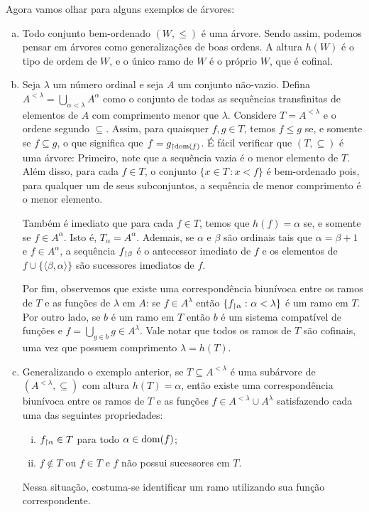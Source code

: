 \documentclass[a4paper]{article}
\begin{document}
  Agora vamos olhar para alguns exemplos de árvores:
  \begin{exemplo}\hfill
    \begin{enumerate}[(a)]
    \item Todo conjunto bem-ordenado \((W,\leq)\) é uma árvore. Sendo assim,
      podemos pensar em árvores como generalizações de boas ordens. A altura
      \(h(W)\) é o tipo de ordem de \(W\), e o único ramo de \(W\) é o próprio
      \(W\), que é cofinal.
    \item Seja \(\lambda\) um número ordinal e seja \(A\) um conjunto não-vazio.
      Defina \(A^{< \lambda}=\bigcup_{\alpha < \lambda} A^\alpha\) como o
      conjunto de todas as sequências transfinitas de elementos de \(A\) com
      comprimento menor que \(\lambda\). Considere \(T=A^{< \lambda}\) e o
      ordene segundo \(\subseteq\). Assim, para quaisquer \(f,g\in T\),
      temos \(f\leq g\) se, e somente se \(f\subseteq g\), o que significa que
      \(f=g_{\upharpoonright \operatorname{dom}(f)}\). É fácil verificar que \((T,\subseteq)\) é uma árvore:
      Primeiro, note que a sequência vazia é o menor elemento de \(T\). Além
      disso, para cada \(f\in T\), o conjunto \(\{x\in T\,\colon x < f\}\) é
      bem-ordenado pois, para qualquer um de seus subconjuntos, a sequência de
      menor comprimento é o menor elemento.

      Também é imediato que para cada \(f\in T\),
      temos que \(h(f)=\alpha\) se, e somente se \( f\in A^\alpha\). Isto é,
      \(T_\alpha =A^\alpha\). Ademais, se \(\alpha\) e \(\beta\) são ordinais
      tais que \(\alpha =\beta +1\) e \(f\in A^\alpha\), a sequência
      \(f_{\upharpoonright \beta}\) é o antecessor imediato de
      \(f\) e os elementos de \(f\cup \{\langle \beta ,\alpha \rangle\}\) são
      sucessores imediatos de \(f\).

      Por fim, observemos que existe uma  correspondência biunívoca entre os
      ramos de \(T\) e as funções de \(\lambda\) em \(A\):
      se \(f\in A^\lambda\) então \(\{{f_{\upharpoonright \alpha}\,\colon\alpha <\lambda}\}\) é
      um ramo em \(T\). Por outro lado, se \(b\) é um ramo em
      \(T\) então \(b\) é um sistema compatível de funções
      e \(f=\bigcup_{g\in b} g\in A^\lambda\). Vale notar que todos os ramos de \(T\) são
      cofinais, uma vez que possuem comprimento \(\lambda=h(T)\).
      
    \item Generalizando o exemplo anterior, se
      \(T\subseteq A^{<\lambda}\) é uma subárvore de 
      \((A^{<\lambda},\subseteq)\) com altura \(h(T)=\alpha\), então existe uma
      correspondência biunívoca entre os ramos de \(T\) e as funções
      \(f\in A^{<\lambda}\cup A^\lambda\) satisfazendo cada uma das seguintes
      propriedades:
      \begin{enumerate}[(i)]
      \item \(f_{\upharpoonright \alpha}\in T\) para todo \(\alpha \in \operatorname{dom}(f)\);
      \item \(f\not\in T\) ou \(f\in T\) e \(f\) não possui sucessores em \(T\). 
      \end{enumerate}
     Nessa situação, costuma-se identificar um  ramo utilizando sua função correspondente.


\end{enumerate}
\end{exemplo}
\end{document}
